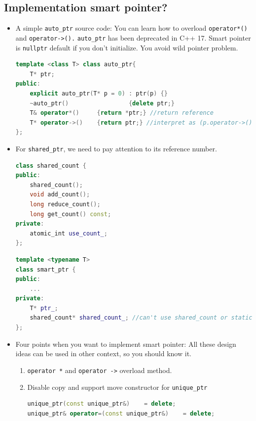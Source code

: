\documentclass[a4paper,11pt,twoside]{book}
\begin{document}
\subsection{Implementation smart pointer?}
\begin{itemize}

		\item A simple \texttt{auto\_ptr} source code: You can learn how to overload \texttt{operator*()} and \texttt{operator->().} \texttt{auto\_ptr} has been deprecated in C++ 17. Smart pointer is \texttt{nullptr} default if you don't initialize. You avoid wild pointer problem.
\begin{lstlisting}[frame=single, language=c++, mathescape=true]
template <class T> class auto_ptr{
    T* ptr;
public:
    explicit auto_ptr(T* p = 0) : ptr(p) {}
    ~auto_ptr()                 {delete ptr;}
    T& operator*()     {return *ptr;} //return reference 
    T* operator->()    {return ptr;} //interpret as (p.operator->())->m
};
\end{lstlisting}



	\item For \texttt{shared\_ptr}, we need to pay attention to its reference number. 
\begin{lstlisting}[frame=single, language=c++, mathescape=true]
class shared_count {
public:
	shared_count();
	void add_count();
	long reduce_count();
	long get_count() const;
private:
	atomic_int use_count_;
};
\end{lstlisting}

\begin{lstlisting}[frame=single, language=c++, mathescape=true]
template <typename T>
class smart_ptr {
public:  
	...
private:  
	T* ptr_;  
	shared_count* shared_count_; //can't use shared_count or static shared_count
};
\end{lstlisting}

	\item Four points when you want to implement smart pointer: All these design ideas can be used in other context, so you should know it. 

	\begin{enumerate}
		\item \texttt{operator *} and \texttt{operator ->} overload method.
		\item Disable copy and support move constructor for \texttt{unique\_ptr}
\begin{lstlisting}[frame=single, language=c++, mathescape=true]
unique_ptr(const unique_ptr&)    = delete;  
unique_ptr& operator=(const unique_ptr&)    = delete;
\end{lstlisting}


\end{enumerate}
\end{itemize}
\end{document}
